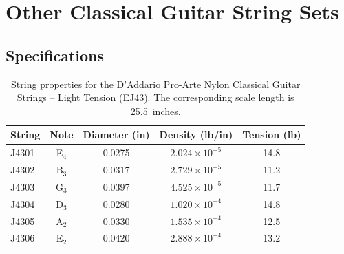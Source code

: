 %
%
%

 \section{Other Classical Guitar String Sets\label{app:specs}}
 
 \subsection{Specifications}

\begin{table}[htbp]
  \centering
  \caption{\label{tbl:ej43_ips} String properties for the D'Addario Pro-Arte Nylon Classical Guitar Strings -- Light Tension (EJ43). The corresponding scale length is 25.5~inches.}
    \begin{tabular}{lcccc}
    \hline \hline
    String  & Note  & \multicolumn{1}{l}{Diameter (in)} & \multicolumn{1}{l}{Density (lb/in)} & \multicolumn{1}{l}{Tension (lb)} \\
    \hline
    J4301 & E$_4$  & 0.0275 & $2.024 \times 10^{-5}$ & 14.8 \\
    J4302 & B$_3$  & 0.0317 & $2.729 \times 10^{-5}$ & 11.2 \\
    J4303 & G$_3$  & 0.0397 & $4.525 \times 10^{-5}$ & 11.7 \\
    J4304 & D$_3$  & 0.0280 & $1.020 \times 10^{-4}$ & 14.8 \\
    J4305 & A$_2$  & 0.0330 & $1.535 \times 10^{-4}$ & 12.5 \\
    J4306 & E$_2$  & 0.0420 & $2.888 \times 10^{-4}$ & 13.2 \\
    \hline
    \end{tabular}%
  \label{tab:addlabel}%
\end{table}%

